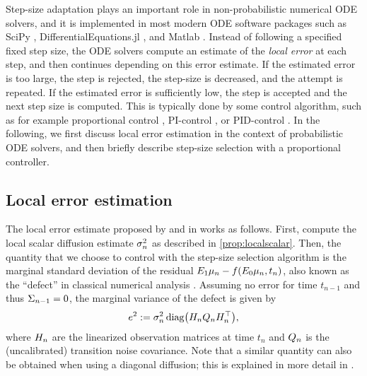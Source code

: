 \documentclass{mimosis}
\begin{document}
Step-size adaptation plays an important role in non-probabilistic numerical ODE solvers, and it is implemented in most modern ODE software packages such as SciPy \parencite{2020SciPy}, DifferentialEquations.jl \parencite{rackauckas2017differentialequations}, and Matlab \parencite{shampine1997matlab}.
Instead of following a specified fixed step size, the ODE solvers compute an estimate of the \emph{local error} at each step, and then continues depending on this error estimate.
If the estimated error is too large, the step is rejected, the step-size is decreased, and the attempt is repeated.
If the estimated error is sufficiently low, the step is accepted and the next step size is computed.
This is typically done by some control algorithm, such as for example
proportional control \parencite[Chapter II.4]{hairer2008solving},
PI-control \parencite{Gustafsson1988},
or PID-control
\parencite{willis1999pid}.
In the following, we first discuss local error estimation in the context of probabilistic ODE solvers, and then briefly describe step-size selection with a proportional controller.
\subsection{Local error estimation}
\label{sec:orga02123d}
The local error estimate proposed by
\textcite{schober16_probab_model_numer_solut_initial_value_probl}
and in
\capos{}
works as follows.
First, compute the local scalar diffusion estimate \(\sigma^2_n\) as described in \cref{prop:localscalar}.
Then, the quantity that we choose to control with the step-size selection algorithm is the marginal standard deviation of the residual
\(\proj{1}\mu_n - \vf(\proj{0}\mu_n, t_n)\),
also known as the ``defect'' in classical numerical analysis
\parencite{enright2000,higham1989,Shampine2005}.
Assuming no error for time \(t_{n-1}\) and thus \(\Sigma_{n-1}=0\), the marginal variance of the defect is given by
\begin{equation}
   \label{eq:defect-std}
   e^2 := \sdiff^2_n \diag( \obsA_n \transC_n \obsA_n^\T ),
\end{equation}
where \(H_n\) are the linearized observation matrices at time \(t_n\) and \(Q_n\) is the (uncalibrated) transition noise covariance.
Note that a similar quantity can also be obtained when using a diagonal diffusion; this is explained in more detail in
\capos{}.
\end{document}
